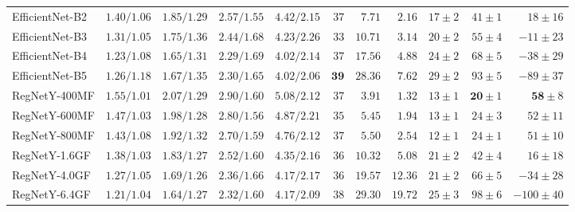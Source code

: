 \begin{table}
\begin{adjustbox}{angle=90, max height=0.85\textheight}
\begin{tabular}{lrrrrrrrrrr}
        EfficientNet-B2 & $1.40/1.06         $ & $ 1.85/1.29         $ & $ 2.57/1.55         $ & $  4.42/2.15                  $ & $  37         $ & $ 7.71$ & $ 2.16$ & $17          \pm 2$ & $41          \pm 1$ & $  18          \pm 16$ \\
        EfficientNet-B3 & $1.31/1.05         $ & $ 1.75/1.36         $ & $ 2.44/1.68         $ & $  4.23/2.26                  $ & $  33         $ & $10.71$ & $ 3.14$ & $20          \pm 2$ & $55          \pm 4$ & $- 11          \pm 23$ \\
        EfficientNet-B4 & $\mathbf{1.23}/1.08$ & $ \mathbf{1.65}/1.31$ & $ \mathbf{2.29}/1.69$ & $  \mathbf{4.02}/2.14         $ & $  37         $ & $17.56$ & $ 4.88$ & $24          \pm 2$ & $68          \pm 5$ & $- 38          \pm 29$ \\
        EfficientNet-B5 & $1.26/1.18         $ & $ 1.67/1.35         $ & $ \mathbf{2.30}/1.65$ & $  \mathbf{4.02}/\mathbf{2.06}$ & $  \mathbf{39}$ & $28.36$ & $ 7.62$ & $29          \pm 2$ & $93          \pm 5$ & $- 89          \pm 37$ \\
        RegNetY-400MF   & $1.55/\mathbf{1.01}$ & $ 2.07/1.29         $ & $ 2.90/1.60         $ & $  5.08/2.12                  $ & $  37         $ & $ 3.91$ & $ 1.32$ & $13          \pm 1$ & $\mathbf{20} \pm 1$ & $  \mathbf{58} \pm  8$ \\
        RegNetY-600MF   & $1.47/1.03         $ & $ 1.98/1.28         $ & $ 2.80/1.56         $ & $  4.87/2.21                  $ & $  35         $ & $ 5.45$ & $ 1.94$ & $13          \pm 1$ & $24          \pm 3$ & $  52          \pm 11$ \\
        RegNetY-800MF   & $1.43/1.08         $ & $ 1.92/1.32         $ & $ 2.70/1.59         $ & $  4.76/2.12                  $ & $  37         $ & $ 5.50$ & $ 2.54$ & $12          \pm 1$ & $24          \pm 1$ & $  51          \pm 10$ \\
        RegNetY-1.6GF   & $1.38/1.03         $ & $ 1.83/1.27         $ & $ 2.52/1.60         $ & $  4.35/2.16                  $ & $  36         $ & $10.32$ & $ 5.08$ & $21          \pm 2$ & $42          \pm 4$ & $  16          \pm 18$ \\
        RegNetY-4.0GF   & $1.27/1.05         $ & $ 1.69/\mathbf{1.26}$ & $ 2.36/1.66         $ & $  4.17/2.17                  $ & $  36         $ & $19.57$ & $12.36$ & $21          \pm 2$ & $66          \pm 5$ & $- 34          \pm 28$ \\
        RegNetY-6.4GF   & $\mathbf{1.21}/1.04$ & $ \mathbf{1.64}/1.27$ & $ 2.32/1.60         $ & $  4.17/2.09                  $ & $  38         $ & $29.30$ & $19.72$ & $25          \pm 3$ & $98          \pm 6$ & $-100          \pm 40$ \\

\end{tabular}
\end{adjustbox}
\end{table}

